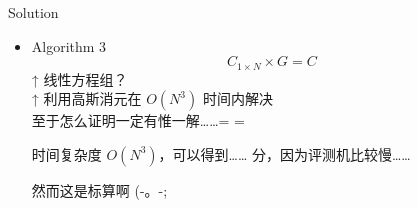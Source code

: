 \documentclass[UTF8]{beamer}
\begin{document}
\begin{frame}{Solution}
\begin{itemize}
    \item Algorithm 3 \\
        $$
            C_{1 \times N} \times G = C
        $$
        \pause ↑ 线性方程组？ \\
        \pause ↑ 利用高斯消元在 $O(N^3)$ 时间内解决 \\
        \pause 至于怎么证明一定有惟一解……= =

        时间复杂度 $O(N^3)$，可以得到……
         分，因为评测机比较慢……

        \pause 然而这是标算啊 (-。-;
\end{itemize}

\end{frame}
\end{document}
